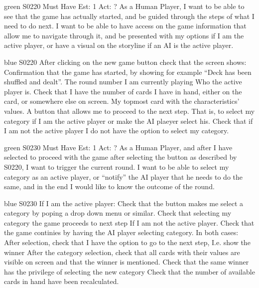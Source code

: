 \newpage

\begin{card}{green}
{S0220}
{Must Have}
{Est: 1}
{Act: ?}
As a Human Player, I want to be able to see that the game has actually started, and be guided through the steps of what I need to do next. 
I want to be able to have access on the game information that allow me to navigate through it, and be presented with my options if I am the active player, or have a visual on the storyline if an AI is the active player.
\end{card}

\begin{card}{blue}
{S0220}{}{}{}
After clicking on the new game button check that the screen shows: Confirmation that the game has started, by showing for example ``Deck has been shuffled and dealt''.
The round number I am currently playing Who the active player is.
Check that I have the number of cards I have in hand, either on the card, or somewhere else on screen.
My topmost card with the characteristics' values.
A button that allows me to proceed to the next step. 
That is, to select my category if I am the active player or make the AI plaeyer select his. 
Check that if I am not the active player I do not have the option to select my category.
\end{card}


\newpage

\begin{card}{green}
{S0230}
{Must Have}
{Est: 1}
{Act: ?}
As a Human Player, and after I have selected to proceed with the game after selecting the button as described by S0220, I want  to trigger the current round.
I want to be able to select my category as an active player, or ``notify'' the AI player that he needs to do the same, and in the end I would like to know the outcome of the round.
\end{card}

\begin{card}{blue}
{S0230}{}{}{}
If I am the active player: Check that the button makes me select a category by poping a drop down menu or similar. 
Check that selecting my category the game proceeds to next step If I am not the active player. 
Check that the game continies by having the AI player selecting category.
In both cases: After selection, check that I have the option to go to the next step, I.e. show the winner After the category selection, check that all cards with their values are visible on screen and that the winner is mentioned. 
Check that the same winner has the privilege of selecting the new category Check that the number of available cards in hand have been recalculated.
\end{card}

